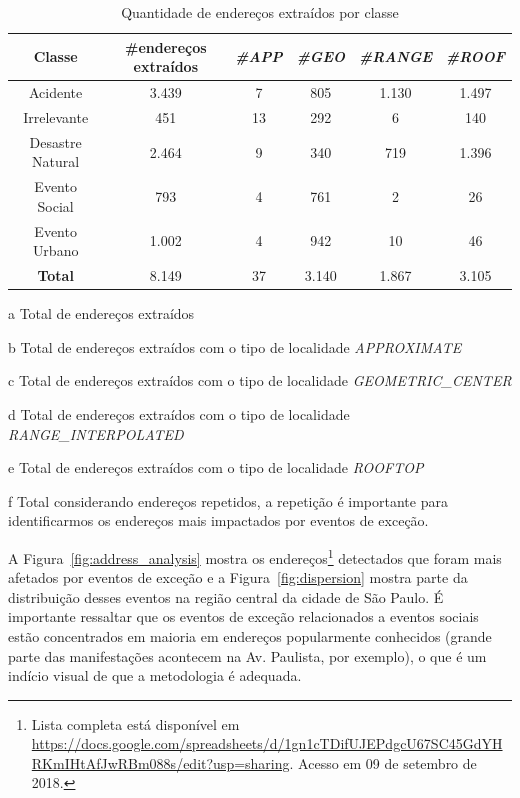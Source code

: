 \documentclass[
	12pt,				%
	oneside,			%
	a4paper,			%
	english,			%
	brazil				%
	]{abntex2ppgsi}
\begin{document}
{{\begin{table}[!htb]
\centering
\caption {Quantidade de endereços extraídos por classe}
\label {tab:qtdExtractedAddresses}
\begin{threeparttable}
\begin{tabular}{c|c|c|c|c|c}
\toprule
\textbf{Classe} & \textbf{\#endereços extraídos\tnote{a}} & \textbf{\textit{\#APP\tnote{b}}} & \textbf{\textit{\#GEO\tnote{c}}} & \textbf{\textit{\#RANGE\tnote{d}}} & \textbf{\textit{\#ROOF\tnote{e}}} \\
\midrule
Acidente & 3.439 & 7 & 805 & 1.130 & 1.497 \\
\hline
Irrelevante & 451 & 13 & 292 & 6 & 140 \\
\hline
Desastre Natural & 2.464 & 9 & 340 & 719 & 1.396 \\
\hline
Evento Social & 793 & 4 & 761 & 2 & 26 \\
\hline
Evento Urbano & 1.002 & 4 & 942 & 10 & 46 \\
\midrule
\midrule
\textbf{Total} & 8.149 & 37 & 3.140 & 1.867 & 3.105 \\
\bottomrule
\end{tabular}
\begin{tablenotes}
\item[a] Total de endereços extraídos
\item[b] Total de endereços extraídos com o tipo de localidade \textit{APPROXIMATE}
\item[c] Total de endereços extraídos com o tipo de localidade \textit{GEOMETRIC\_CENTER}
\item[d] Total de endereços extraídos com o tipo de localidade \textit{RANGE\_INTERPOLATED}
\item[e] Total de endereços extraídos com o tipo de localidade \textit{ROOFTOP}
\item[f] Total considerando endereços repetidos, a repetição é importante para identificarmos os endereços mais impactados por eventos de exceção.
\end{tablenotes}
\end{threeparttable}
\end{table}


A Figura~\ref{fig:address_analysis} mostra os endereços\footnote{Lista completa está disponível em \url{https://docs.google.com/spreadsheets/d/1gn1cTDifUJEPdgcU67SC45GdYHRKmIHtAfJwRBm088s/edit?usp=sharing}. Acesso em 09 de setembro de 2018.} detectados que foram mais afetados por eventos de exceção e a Figura~\ref{fig:dispersion} mostra parte da distribuição desses eventos na região central da cidade de São Paulo. É importante ressaltar que os eventos de exceção relacionados a eventos sociais estão concentrados em maioria em endereços popularmente conhecidos (grande parte das manifestações acontecem na Av. Paulista, por exemplo), o que é um indício visual de que a metodologia é adequada.

}}
\end{document}
